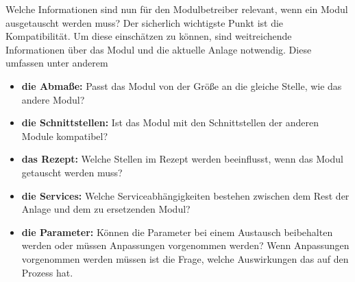 Welche Informationen sind nun für den Modulbetreiber relevant, wenn ein Modul ausgetauscht werden muss? Der sicherlich wichtigste Punkt ist die Kompatibilität. Um diese einschätzen zu können, sind weitreichende Informationen über das Modul und die aktuelle Anlage notwendig. Diese umfassen unter anderem
\begin{itemize}
\item \textbf{die Abmaße:} Passt das Modul von der Größe an die gleiche Stelle, wie das andere Modul?
\item \textbf{die Schnittstellen:} Ist das Modul mit den Schnittstellen der anderen Module kompatibel?
\item \textbf{das Rezept:} Welche Stellen im Rezept werden beeinflusst, wenn das Modul getauscht werden muss?
\item \textbf{die Services:} Welche Serviceabhängigkeiten bestehen zwischen dem Rest der Anlage und dem zu ersetzenden Modul?
\item \textbf{die Parameter:} Können die Parameter bei einem Austausch beibehalten werden oder müssen Anpassungen vorgenommen werden? Wenn Anpassungen vorgenommen werden müssen ist die Frage, welche Auswirkungen das auf den Prozess hat.
\end{itemize}

